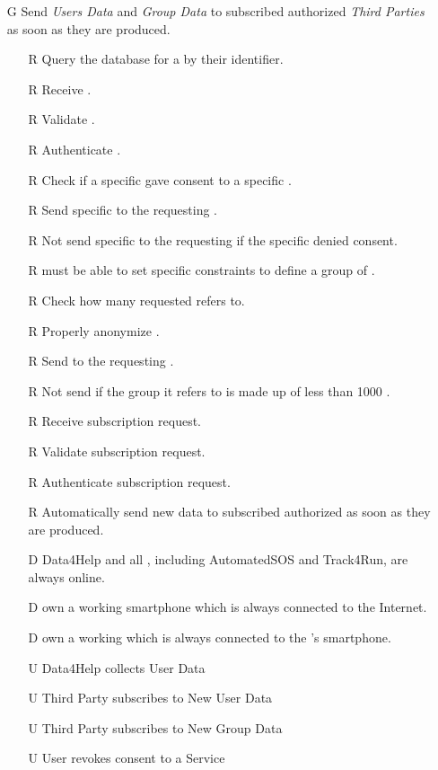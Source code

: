 \documentclass[../../../rasd.tex]{subfiles}
\begin{document}
\begin{itemize}
    \item[G\subs{4}]Send \textit{Users Data} and \textit{Group Data} to subscribed authorized \textit{Third Parties} as soon as they are produced.
    \begin{itemize}
        \item[R\subs{7}]Query the database for a  by their identifier.
        \item[R\subs{8}]Receive .
        \item[R\subs{9}]Validate .
        \item[R\subs{10}]Authenticate .
        \item[R\subs{18}]Check if a specific  gave consent to a specific .
        \item[R\subs{19}]Send specific to the requesting .
        \item[R\subs{20}]Not send specific to the requesting  if the specific  denied consent.
        \item[R\subs{21}] must be able to set specific constraints to define a group of .
        \item[R\subs{22}]Check how many  requested  refers to.
        \item[R\subs{23}]Properly anonymize .
        \item[R\subs{24}]Send  to the requesting .
        \item[R\subs{25}]Not send  if the group it refers to is made up of less than 1000 .
        \item[R\subs{26}]Receive  subscription request.
        \item[R\subs{27}]Validate  subscription request.
        \item[R\subs{28}]Authenticate  subscription request.
        \item[R\subs{29}]Automatically send new data to subscribed authorized  as soon as they are produced.
        \\
        \item[D\subs{9}]Data4Help and all , including AutomatedSOS and Track4Run, are always online.
        \item[D\subs{10}] own a working smartphone which is always connected to the Internet.
        \item[D\subs{11}] own a working  which is always connected to the 's smartphone.
        \\
        \item[U\subs{5}]Data4Help collects User Data
        \item[U\subs{8}]Third Party subscribes to New User Data
        \item[U\subs{9}]Third Party subscribes to New Group Data
        \item[U\subs{11}]User revokes consent to a Service
    \end{itemize}


\end{itemize}
\end{document}
